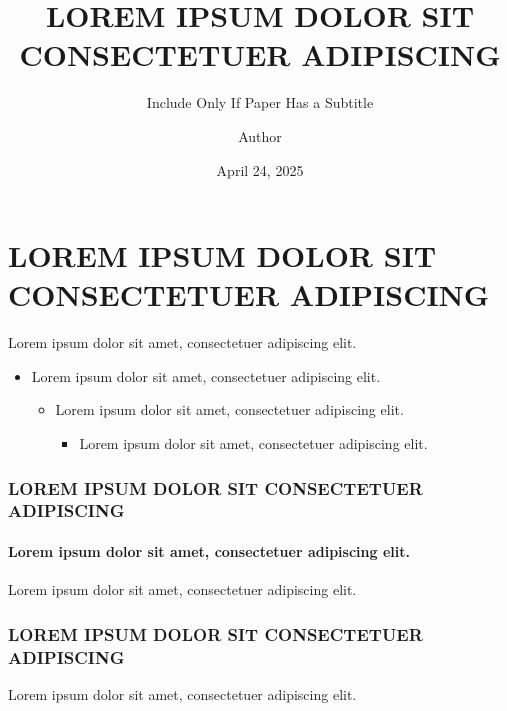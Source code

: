 \documentclass[12pt, aspectratio=169]{beamer}
\title[]{LOREM IPSUM DOLOR SIT CONSECTETUER ADIPISCING}
\author{Author}
\date{April 24, 2025}
\subtitle{Include Only If Paper Has a Subtitle}
\begin{document}
\begin{frame}
	\maketitle
\end{frame}

\begin{frame}
\end{frame}


\section{LOREM IPSUM DOLOR SIT CONSECTETUER ADIPISCING}
\begin{frame}[t]{\secname}{Lorem ipsum dolor sit amet, consectetuer adipiscing elit.}
	\begin{itemize}
		\item Lorem ipsum dolor sit amet, consectetuer adipiscing elit.
         \begin{itemize}
             \item Lorem ipsum dolor sit amet, consectetuer adipiscing elit.
             \begin{itemize}
                \item Lorem ipsum dolor sit amet, consectetuer adipiscing elit.
             \end{itemize}
         \end{itemize}
	\end{itemize}
\end{frame}

\begin{frame}[t]
    \frametitle{LOREM IPSUM DOLOR SIT CONSECTETUER ADIPISCING}
    \framesubtitle{Lorem ipsum dolor sit amet, consectetuer adipiscing elit.}
    Lorem ipsum dolor sit amet, consectetuer adipiscing elit.
\end{frame}

\begin{frame}
    \frametitle{LOREM IPSUM DOLOR SIT CONSECTETUER ADIPISCING}
    Lorem ipsum dolor sit amet, consectetuer adipiscing elit.
\end{frame}

\end{document}
